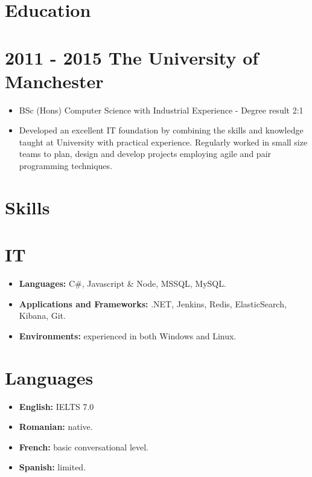 \documentclass[12pt,a4paper]{res}
\begin{document}
\begin{resume}
\newpage 

\section{\large\bf Education}
\vspace{5mm}

\section{\bf 2011 - 2015 \hspace{1.5mm}The University of Manchester}
  
  \begin{itemize} %
     \item[] BSc (Hons) Computer Science  with Industrial Experience - Degree result 2:1
     \item Developed an excellent IT foundation by combining the skills and knowledge taught at University with practical experience. Regularly worked in small size teams to plan, design and develop projects employing agile and pair programming techniques.
   \end{itemize}

	
\section{\large\bf Skills}
\vspace{2mm}
\section{IT}
\vspace{-1mm}
  \begin{itemize}

  \item[] {\bf Languages:} C\#, Javascript \& Node, MSSQL, MySQL.
  \item[] {\bf Applications and Frameworks:} .NET, Jenkins, Redis, ElasticSearch, Kibana, Git.
  \item[] {\bf Environments:} experienced in both Windows and Linux.
  \end{itemize}
\vspace{-3mm}
      
    
\section{Languages}
\vspace{-0.7mm}
\begin{itemize}
\item[] {\bf English:} IELTS 7.0
\item[] {\bf Romanian:} native.
\item[] {\bf French:} basic conversational level.
\item[] {\bf Spanish:} limited. 
\end{itemize}
\vspace{-3mm}


\end{resume}
\end{document}

